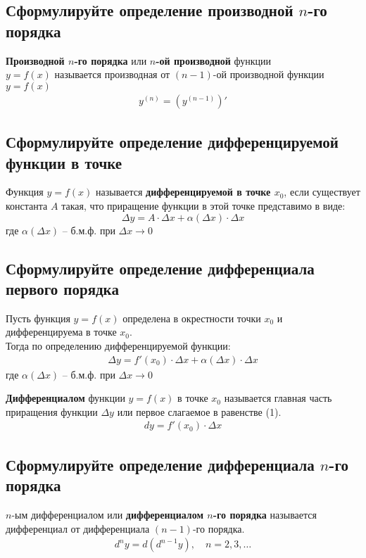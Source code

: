 \subsection{Сформулируйте определение производной $n$-го порядка}
\begin{definition}
	\textbf{Производной $n$-го порядка} или \textbf{$n$-ой производной} функции \\ $y=f(x)$ называется производная от $(n-1)$-ой производной функции $y=f(x)$
	\begin{align*}
		\boxed{y^{(n)} = \left( y^{(n-1)} \right)'}
	\end{align*}
\end{definition}

\subsection{Сформулируйте определение дифференцируемой функции в точке}
\begin{definition}
	Функция $y=f(x)$ называется \textbf{дифференцируемой в точке $x_0$}, если существует константа $A$ такая, что приращение функции в этой точке представимо в виде: \[ \boxed{\Delta y = A\cdot \Delta x + \alpha (\Delta x) \cdot \Delta x} \]
	где $\alpha (\Delta x)$ -- б.м.ф. при $\Delta x \to 0$
\end{definition}
\newpage
\subsection{Сформулируйте определение дифференциала первого порядка}
Пусть функция $y=f(x)$ определена в окрестности точки $x_0$ и дифференцируема в точке $x_0$.\\
Тогда по определению дифференцируемой функции: \begin{align}
	\Delta y = f'(x_0) \cdot \Delta x + \alpha (\Delta x) \cdot \Delta x
\end{align}
где $\alpha (\Delta x)$ -- б.м.ф. при $\Delta x \to 0$
\begin{definition}
	\textbf{Дифференциалом} функции $y=f(x)$ в точке $x_0$ называется главная часть приращения функции $\Delta y$ или первое слагаемое в равенстве (1).
	\begin{align}
		\boxed{dy = f'(x_0) \cdot \Delta x}
	\end{align}
\end{definition}

\subsection{Сформулируйте определение дифференциала $n$-го порядка}
\begin{definition}
	$n$-ым дифференциалом или \textbf{дифференциалом $n$-го порядка} называется дифференциал от дифференциала $(n-1)$-го порядка.
	\begin{gather*}
		{d}^ny = d({d}^{n-1}y), \quad n=2,3,\ldots
	\end{gather*}
\end{definition}

